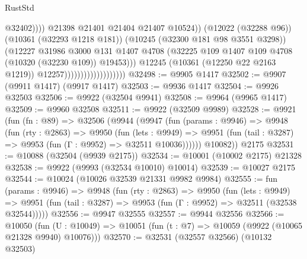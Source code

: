 \begin{lexlean}{RustStd}
\begin{coremodule}
                                                        @32402))))
                                                @21398
                                                @21401
                                                @21404
                                                @21407
                                                @10524))
                                            (@12022 (@32288 @96))
                                            (@10361 (@32293 @1218 @181))
                                            (@10245 (@32300 @181 @98 @3551 @3298))
                                            (@12227
                                              @31986
                                              @3000
                                              @131
                                              @1407
                                              @4708
                                              (@32225
                                                @109
                                                @1407
                                                @109
                                                @4708
                                                (@10320 (@32230 @109))
                                                @19453)))
                                          @12245
                                          (@10361 (@12250 @22 @2163 @1219))
                                          @12257)))))))))))))))))))
@32498 := @9905 @1417
@32502 := @9907 (@9911 @1417) (@9917 @1417)
@32503 := @9936 @1417
@32504 := @9926 @32503
@32506 := @9922 (@32504 @9941)
@32508 := @9964 (@9965 @1417)
@32509 := @9960 @32508
@32511 := @9922 (@32509 @9989)
@32528 := @9921
    (fun (fn : @89) =>
    @32506
      (@9944
        (@9947
          (fun (params : @9946) =>
          @9948
            (fun (rty : @2863) =>
            @9950
              (fun (lets : @9949) =>
              @9951 (fun (tail : @3287) => @9953 (fun (Γ : @9952) => @32511 @10036))))))
        @10082))
    @2175
@32531 := @10088 (@32504 (@9939 @2175))
@32534 := @10001 (@10002 @2175) @21328
@32538 := @9922 (@9993 (@32534 @10010) @10014)
@32539 := @10027 @2175
@32544 := @10024 (@10026 @32539 @21331 @9982 @9984)
@32555 := fun (params : @9946) =>
  @9948
    (fun (rty : @2863) =>
    @9950
      (fun (lets : @9949) =>
      @9951 (fun (tail : @3287) => @9953 (fun (Γ : @9952) => @32511 (@32538 @32544)))))
@32556 := @9947 @32555
@32557 := @9944 @32556
@32566 := @10050
    (fun (U : @10049) => @10051 (fun (t : @7) => @10059 (@9922 (@10065 @21328 @9940) @10076)))
@32570 := @32531 (@32557 @32566) (@10132 @32503)

\end{coremodule}
\end{lexlean}
